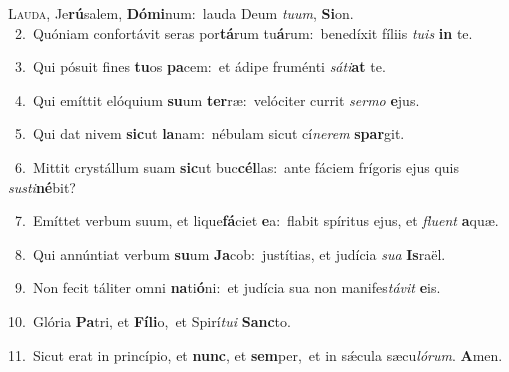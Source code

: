 \lettrine{\initial\textcolor{\initialcolor}{L}}{auda,} Je\-\textbf{rú}\-salem, \textbf{Dó}\-\textbf{mi}num:~\star lauda Deum \textit{tu}\-\textit{um}, \textbf{Si}\-on.\\
{\numbfont\textcolor{\numbcolor}{~2.}}~Quóniam confortávit seras por\-\textbf{tá}\-rum tu\-\textbf{á}\-rum:~\star benedíxit fíliis \textit{tu}\-\textit{is} \textbf{in} te.\par
{\numbfont\textcolor{\numbcolor}{~3.}}~Qui pósuit fines \textbf{tu}\-os \textbf{pa}\-cem:~\star et ádipe fruménti \textit{sá}\-\textit{ti}\textbf{at} te.\par
{\numbfont\textcolor{\numbcolor}{~4.}}~Qui emíttit elóquium \textbf{su}\-um \textbf{ter}\-ræ:~\star velóciter currit \textit{ser}\-\textit{mo} \textbf{e}\-jus.\par
{\numbfont\textcolor{\numbcolor}{~5.}}~Qui dat nivem \textbf{sic}\-ut \textbf{la}\-nam:~\star nébulam sicut cí\-\textit{ne}\-\textit{rem} \textbf{spar}\-git.\par
{\numbfont\textcolor{\numbcolor}{~6.}}~Mittit crystállum suam \textbf{sic}\-ut buc\-\textbf{cél}\-las:~\star ante fáciem frígoris ejus quis \textit{sus}\-\textit{ti}\textbf{né}bit?\par
{\numbfont\textcolor{\numbcolor}{~7.}}~Emíttet verbum suum, et lique\-\textbf{fá}\-ciet \textbf{e}\-a:~\star flabit spíritus ejus, et \textit{flu}\-\textit{ent} \textbf{a}\-quæ.\par
{\numbfont\textcolor{\numbcolor}{~8.}}~Qui annúntiat verbum \textbf{su}\-um \textbf{Ja}\-cob:~\star justítias, et judícia \textit{su}\-\textit{a} \textbf{Is}\-raël.\par
{\numbfont\textcolor{\numbcolor}{~9.}}~Non fecit táliter omni \textbf{na}\-ti\-\textbf{ó}\-ni:~\star et judícia sua non manifes\-\textit{tá}\-\textit{vit} \textbf{e}\-is.\par
{\numbfont\textcolor{\numbcolor}{10.}}~Glória \textbf{Pa}\-tri, et \textbf{Fí}\-\textbf{li}o,~\star et Spirí\-\textit{tu}\-\textit{i} \textbf{Sanc}\-to.\par
{\numbfont\textcolor{\numbcolor}{11.}}~Sicut erat in princípio, et \textbf{nunc}\-, et \textbf{sem}\-per,~\star et in sǽcula sæcu\-\textit{ló}\-\textit{rum}. \textbf{A}\-men.\par
